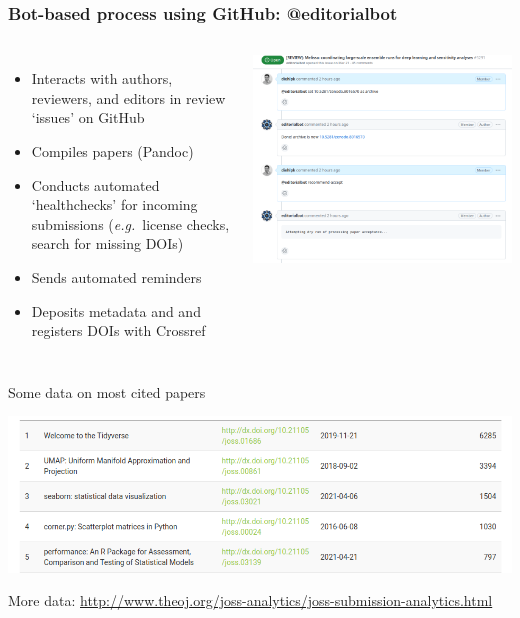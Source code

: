 \begin{frame}\frametitle{Bot-based process using GitHub: @editorialbot}

    \begin{columns}
    \begin{itemize}
        \item Interacts with authors, reviewers, and editors
in review ‘issues’ on GitHub
\item Compiles papers (Pandoc)
\item Conducts automated ‘healthchecks’ for
incoming submissions (\emph{e.g.}\ license checks,
search for missing DOIs)
\item Sends automated reminders
\item Deposits metadata and
 and 
registers DOIs with Crossref
    \end{itemize}
        
        \centering
        \includegraphics[width=\textwidth]{joss-github.png}
    \end{columns}

\end{frame}

\begin{frame}{Some data on most cited papers}

\includegraphics[width=\linewidth]{most-cited.png}



{\tiny More data: \url{http://www.theoj.org/joss-analytics/joss-submission-analytics.html}}    
\end{frame}


